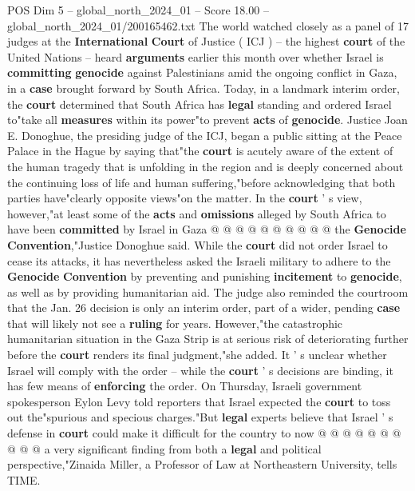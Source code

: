 \begin{textsample}{POS Dim 5 – global\_north\_2024\_01 – Score 18.00 – global\_north\_2024\_01/200165462.txt}  \label{ex:f5_pos_139}
The world watched closely as a panel of 17 judges at the \textbf{International} \textbf{Court} of Justice ( ICJ ) -- the highest \textbf{court} of the United Nations -- heard \textbf{arguments} earlier this month over whether Israel is \textbf{committing} \textbf{genocide} against Palestinians amid the ongoing conflict in Gaza, in a \textbf{case} brought forward by South Africa.
Today, in a landmark interim order, the \textbf{court} determined that South Africa has \textbf{legal} standing and ordered Israel to"take all \textbf{measures} within its power"to prevent \textbf{acts} of \textbf{genocide}.
Justice Joan E.
Donoghue, the presiding judge of the ICJ, began a public sitting at the Peace Palace in the Hague by saying that"the \textbf{court} is acutely aware of the extent of the human tragedy that is unfolding in the region and is deeply concerned about the continuing loss of life and human suffering,"before acknowledging that both parties have"clearly opposite views"on the matter.
In the \textbf{court} ' s view, however,"at least some of the \textbf{acts} and \textbf{omissions} alleged by South Africa to have been \textbf{committed} by Israel in Gaza @ @ @ @ @ @ @ @ @ @ the \textbf{Genocide} \textbf{Convention},"Justice Donoghue said.
While the \textbf{court} did not order Israel to cease its attacks, it has nevertheless asked the Israeli military to adhere to the \textbf{Genocide} \textbf{Convention} by preventing and punishing \textbf{incitement} to \textbf{genocide}, as well as by providing humanitarian aid.
The judge also reminded the courtroom that the Jan. 26 decision is only an interim order, part of a wider, pending \textbf{case} that will likely not see a \textbf{ruling} for years.
However,"the catastrophic humanitarian situation in the Gaza Strip is at serious risk of deteriorating further before the \textbf{court} renders its final judgment,"she added.
It ' s unclear whether Israel will comply with the order -- while the \textbf{court} ' s decisions are binding, it has few means of \textbf{enforcing} the order.
On Thursday, Israeli government spokesperson Eylon Levy told reporters that Israel expected the \textbf{court} to toss out the"spurious and specious charges."But \textbf{legal} experts believe that Israel ' s defense in \textbf{court} could make it difficult for the country to now @ @ @ @ @ @ @ @ @ @ a very significant finding from both a \textbf{legal} and political perspective,"Zinaida Miller, a Professor of Law at Northeastern University, tells TIME.

\end{textsample}
